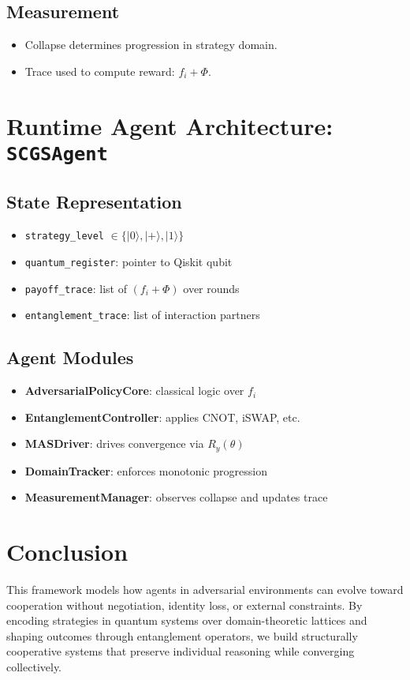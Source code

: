 \documentclass[11pt]{article}
\begin{document}
\subsection*{Measurement}
\begin{itemize}[noitemsep]
    \item Collapse determines progression in strategy domain.
    \item Trace used to compute reward: $f_i + \Phi$.
\end{itemize}

\section{Runtime Agent Architecture: \texttt{SCGSAgent}}

\subsection*{State Representation}
\begin{itemize}[noitemsep]
    \item \texttt{strategy\_level} $\in \{|0\rangle, |+\rangle, |1\rangle\}$
    \item \texttt{quantum\_register}: pointer to Qiskit qubit
    \item \texttt{payoff\_trace}: list of $(f_i + \Phi)$ over rounds
    \item \texttt{entanglement\_trace}: list of interaction partners
\end{itemize}

\subsection*{Agent Modules}
\begin{itemize}[noitemsep]
    \item \textbf{AdversarialPolicyCore}: classical logic over $f_i$
    \item \textbf{EntanglementController}: applies CNOT, iSWAP, etc.
    \item \textbf{MASDriver}: drives convergence via $R_y(\theta)$
    \item \textbf{DomainTracker}: enforces monotonic progression
    \item \textbf{MeasurementManager}: observes collapse and updates trace
\end{itemize}

\section{Conclusion}

This framework models how agents in adversarial environments can evolve toward cooperation without negotiation, identity loss, or external constraints. By encoding strategies in quantum systems over domain-theoretic lattices and shaping outcomes through entanglement operators, we build structurally cooperative systems that preserve individual reasoning while converging collectively.
\end{document}
